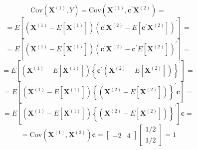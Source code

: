 \begin{enumerate}[label=(\alph*)]
            \[
                \text{Cov}\left(\mathbf{X}^{(1)}, Y\right)
                =
                \text{Cov}\left(\mathbf{X}^{(1)}, \mathbf{c}^\prime
                \mathbf{X}^{(2)}\right)
                =
            \]
            \[
                =
                E\left[\left(\mathbf{X}^{(1)} - E\left[\mathbf{X}^{(1)}\right]\right){\left(\mathbf{c}^\prime\mathbf{X}^{(2)} - E\left[\mathbf{c}^\prime\mathbf{X}^{(2)}\right]\right)}^\prime\right]
                =
            \]
            \[
                =
                E\left[\left(\mathbf{X}^{(1)} - E\left[\mathbf{X}^{(1)}\right]\right){\left(\mathbf{c}^\prime\mathbf{X}^{(2)} - \mathbf{c}^\prime E\left[\mathbf{X}^{(2)}\right]\right)}^\prime\right]
                =
            \]
            \[
                =
                E\left[\left(\mathbf{X}^{(1)} - E\left[\mathbf{X}^{(1)}\right]\right)\left\{\mathbf{c}^\prime\left(\mathbf{X}^{(2)} - E\left[\mathbf{X}^{(2)}\right]\right)\right\}^\prime\right]
                =
            \]
            \[
                =
                E\left[\left(\mathbf{X}^{(1)} - E\left[\mathbf{X}^{(1)}\right]\right)\left\{\left(\mathbf{X}^{(2)} - E\left[\mathbf{X}^{(2)}\right]\right)\right\}^\prime\mathbf{c}\right]
                =
            \]
            \[
                =
                E\left[\left(\mathbf{X}^{(1)} - E\left[\mathbf{X}^{(1)}\right]\right)\left\{\left(\mathbf{X}^{(2)} - E\left[\mathbf{X}^{(2)}\right]\right)\right\}^\prime\right]\mathbf{c}
                =
            \]
            \[
                =
                \text{Cov}\left(\mathbf{X}^{(1)},\mathbf{X}^{(2)}\right)\mathbf{c}
                =
                \begin{bmatrix}
                    -2 & 4
                \end{bmatrix}
                \begin{bmatrix}
                    1/2 \\
                    1/2
                \end{bmatrix}
                =
                1
            \]
        \end{enumerate}